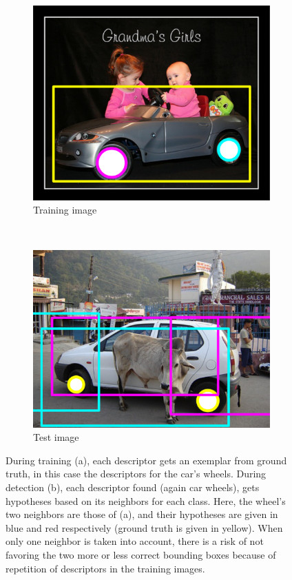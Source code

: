 \begin{figure}[hbt]
    \centering
    \begin{subfigure}[b]{0.45\textwidth}
        \centering
        \includegraphics[width=\textwidth]{aliasing}
        \caption{Training image}
        \label{fig:aliastrainim}
    \end{subfigure}
    ~
    \begin{subfigure}[b]{0.45\textwidth}
        \centering
        \includegraphics[width=\textwidth]{aliasing2}
        \caption{Test image}
        \label{fig:aliastestim}
    \end{subfigure}
    \caption{During training (a), each descriptor gets an exemplar from ground truth, in this case the descriptors for the car's wheels. During detection (b), each descriptor found (again car wheels), gets hypotheses based on its neighbors for each class. Here, the wheel's two neighbors are those of (a), and their hypotheses are given in blue and red respectively (ground truth is given in yellow). When only one neighbor is taken into account, there is a risk of not favoring the two more or less correct bounding boxes because of repetition of descriptors in the training images.}
    \label{fig:aliasing}
\end{figure}

